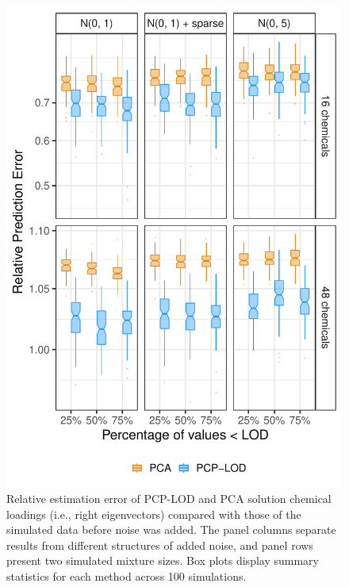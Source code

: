 {\begin{figure}
    \centering
\includegraphics[width=.75\textwidth]{figures/svd_boxplots_right.pdf}
   \caption[Relative error of PCP-LOD and PCA right eigenvectors]{Relative estimation error of PCP-LOD and PCA solution chemical loadings (i.e., right eigenvectors) compared with those of the simulated data before noise was added. The panel columns separate results from different structures of added noise, and panel rows present two simulated mixture sizes. Box plots display summary statistics for each method across 100 simulations.}
    \label{fig:svd_right}
\end{figure}
} %

